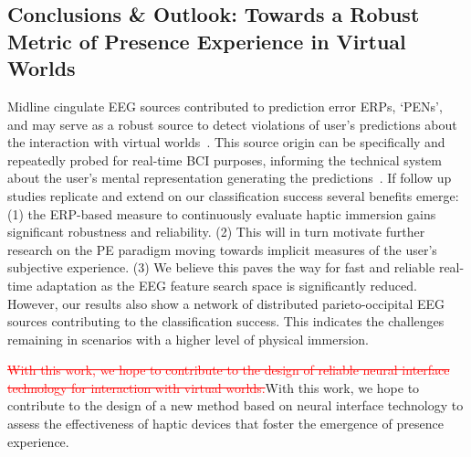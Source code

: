 \subsection{Conclusions \& Outlook: Towards a Robust Metric of Presence Experience in Virtual Worlds}

Midline cingulate EEG sources contributed to prediction error ERPs, `PENs', and may serve as a robust source to detect violations of user's predictions about the interaction with virtual worlds~\cite{Gehrke2019-og, Si-mohammed2020-ru, Zander2016-ed}. This source origin can be specifically and repeatedly probed for real-time BCI purposes, informing the technical system about the user's mental representation generating the predictions~\cite{Krol2020-lj, Zander2016-ed}. If follow up studies replicate and extend on our classification success several benefits emerge: (1) the ERP-based measure to continuously evaluate haptic immersion gains significant robustness and reliability. (2) This will in turn motivate further research on the PE paradigm moving towards implicit measures of the user's subjective experience. (3) We believe this paves the way for fast and reliable real-time adaptation as the EEG feature search space is significantly reduced. However, our results also show a network of distributed parieto-occipital EEG sources contributing to the classification success. This indicates the challenges remaining in scenarios with a higher level of physical immersion. 

\textcolor{red}{\st{With this work, we hope to contribute to the design of reliable neural interface technology for interaction with virtual worlds.}}\textcolor{n}{With this work, we hope to contribute to the design of a new method based on neural interface technology to assess the effectiveness of haptic devices that foster the emergence of presence experience.}




